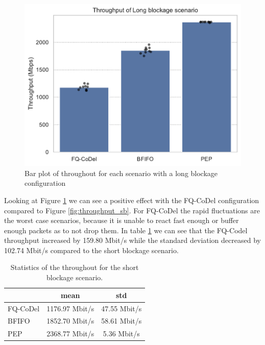 \documentclass[a4paper,english, 11pt]{report}
\begin{document}
\begin{figure}[!h!] %
	\centering 
	\includegraphics[scale=0.70]{../diagrams/witestlab/throughput/throughput_lb.pdf}
  	\caption{Bar plot of throughout for each scenario with a long blockage configuration}
  	\label{fig:throughput_lb}
\end{figure}

Looking at Figure \ref{fig:throughput_lb} we can see a positive effect with the FQ-CoDel configuration compared to Figure \ref{fig:throughput_sb}. For FQ-CoDel the rapid fluctuations are the worst case scenarios, because it is unable to react fast enough or buffer enough packets as to not drop them. In table \ref{tab:throughput_lb_table} we can see that the FQ-Codel throughput increased by 159.80 Mbit/s while the standard deviation decreased by 102.74 Mbit/s compared to the short blockage scenario.

\begin{table}[h!]
\centering
\begin{tabular}{l|c|c}
\hline
 & \textbf{mean} & \textbf{std} \\ 
\hline
FQ-CoDel & 1176.97 Mbit/s      & 47.55 Mbit/s \\
BFIFO    & 1852.70 Mbit/s      & 58.61 Mbit/s  \\
PEP      & 2368.77 Mbit/s      & 5.36  Mbit/s   \\
\hline
\end{tabular}
\caption{Statistics of the throughout for the short blockage scenario.}
\label{tab:throughput_lb_table}
\end{table}
\end{document}
